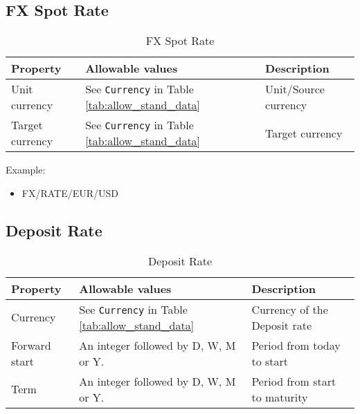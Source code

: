 \subsection{FX Spot Rate}
\label{ss:fx_spot_rate}



\begin{table}[H]
\centering
\begin{tabular}{|p{3cm}|p{3.5cm}|p{7cm}|}
\hline
{\bf Property} & {\bf Allowable values} & {\bf Description}\\
\hline
Unit currency & See \lstinline!Currency! in Table \ref{tab:allow_stand_data} & Unit/Source currency\\ \hline
Target currency & See \lstinline!Currency! in Table \ref{tab:allow_stand_data} & Target currency\\ \hline
\end{tabular}
  \caption{FX Spot Rate}
  \label{tab:fxspot_quote}
\end{table}

Example:
\begin{itemize}
\item {FX/RATE/EUR/USD}
\end{itemize}

\subsection{Deposit Rate}

\begin{table}[H]
\centering
\begin{tabular}{|p{3cm}|p{3.5cm}|p{7cm}|}
\hline
{\bf Property} & {\bf Allowable values} & {\bf Description} \\
\hline
Currency & See \lstinline!Currency! in Table \ref{tab:allow_stand_data} & Currency of the Deposit rate\\ \hline
Forward start & An integer followed by D, W, M or Y.  & Period from today to start \\ \hline
Term & An integer followed by D, W, M or Y. & Period from start to maturity\\ \hline
\end{tabular}
  \caption{Deposit Rate}
  \label{tab:deposit_quote}
\end{table}



